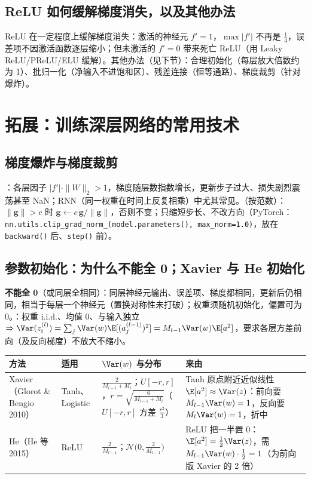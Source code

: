 \subsection{ReLU 如何缓解梯度消失，以及其他办法}
ReLU 在一定程度上缓解梯度消失：激活的神经元 $f'=1$，$\max|f'|$ 不再是 $\frac14$，误差项不因激活函数逐层缩小；但未激活的 $f'=0$ 带来死亡 ReLU（用 Leaky ReLU/PReLU/ELU 缓解）。其他办法（见下节）：合理初始化（每层放大倍数约为 1）、批归一化（净输入不进饱和区）、残差连接（恒等通路）、梯度裁剪（针对爆炸）。

\section{拓展：训练深层网络的常用技术 \tagext}

\subsection{梯度爆炸与梯度裁剪}
：各层因子 $|f'|\cdot\|W\|_2>1$，梯度随层数指数增长，更新步子过大、损失剧烈震荡甚至 NaN；RNN（同一权重在时间上反复相乘）中尤其常见。（按范数）：$\|\bm g\|>c$ 时 $\bm g\leftarrow c\,\bm g/\|\bm g\|$，否则不变；只缩短步长、不改方向（PyTorch：\texttt{nn.utils.clip\_grad\_norm\_(model.parameters(), max\_norm=1.0)}，放在 \texttt{backward()} 后、\texttt{step()} 前）。

\subsection{参数初始化：为什么不能全 0；Xavier 与 He 初始化}
\textbf{不能全 0}（或同层全相同）：同层神经元输出、误差项、梯度都相同，更新后仍相同，相当于每层一个神经元（置换对称性未打破）；权重须随机初始化，偏置可为 0。：权重 i.i.d.、均值 0、与输入独立 $\Rightarrow\Var(z^{(l)}_i)=\sum_j\Var(w)\E[(a^{(l-1)}_j)^2]=M_{l-1}\Var(w)\E[a^2]$，要求各层方差前向（及反向梯度）不放大不缩小。

\noindent\begin{tabularx}{\linewidth}{@{}p{2.9cm}p{1.6cm}p{4.2cm}L@{}}
\toprule
方法 & 适用 & $\Var(w)$ 与分布 & 来由 \\
\midrule
Xavier（Glorot \& Bengio 2010） & Tanh、Logistic & $\frac2{M_{l-1}+M_l}$；$U[-r,r]$，$r=\sqrt{\frac6{M_{l-1}+M_l}}$（$U[-r,r]$ 方差 $\frac{r^2}3$） & Tanh 原点附近近似线性 $\E[a^2]\approx\Var(z)$：前向要 $M_{l-1}\Var(w)=1$，反向要 $M_l\Var(w)=1$，折中 \\
He（He 等 2015） & ReLU & $\frac2{M_{l-1}}$；$\mathcal N\big(0,\frac2{M_{l-1}}\big)$ & ReLU 把一半置 0：$\E[a^2]=\frac12\Var(z)$，需 $M_{l-1}\Var(w)\cdot\frac12=1$（为前向版 Xavier 的 2 倍） \\
\bottomrule
\end{tabularx}

